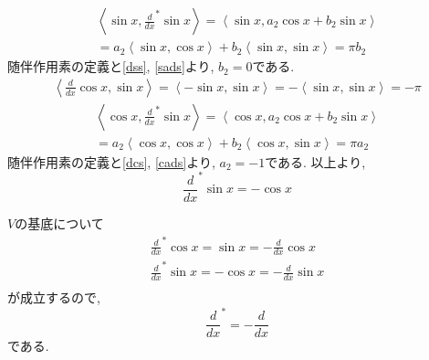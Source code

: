 \documentclass[a4paper,11pt]{jsarticle}
\begin{document}
\begin{enumerate}
    \begin{equation}
      \begin{split}
        \left<\sin{x}, \frac{d}{dx}^*\sin{x}\right>
        = \left<\sin{x}, a_2\cos{x} + b_2\sin{x}\right> \\
        = a_2\left<\sin{x}, \cos{x}\right> + b_2\left<\sin{x}, \sin{x}\right>
        = \pi b_2
      \end{split}
      \label{sads}
    \end{equation}
    随伴作用素の定義と\eqref{dss}, \eqref{sads}より, $b_2=0$である.
    \begin{eqnarray}
      \left<\frac{d}{dx}\cos{x}, \sin{x}\right>
      = \left<-\sin{x}, \sin{x}\right>
      = -\left<\sin{x}, \sin{x}\right>
      = -\pi \label{dcs}
    \end{eqnarray}
    \begin{equation}
      \begin{split}
        \left<\cos{x}, \frac{d}{dx}^*\sin{x}\right>
        = \left<\cos{x}, a_2\cos{x} + b_2\sin{x}\right> \\
        = a_2\left<\cos{x}, \cos{x}\right> + b_2\left<\cos{x}, \sin{x}\right>
        = \pi a_2
      \end{split}
      \label{cads}
    \end{equation}
    随伴作用素の定義と\eqref{dcs}, \eqref{cads}より, $a_2=-1$である.
    以上より, 
    \[
      \frac{d}{dx}^*\sin{x} = -\cos{x}
    \]
\end{enumerate}

$V$の基底について
\begin{eqnarray*}
  \frac{d}{dx}^*\cos{x} = \sin{x} = -\frac{d}{dx}\cos{x} \\
  \frac{d}{dx}^*\sin{x} = -\cos{x} = -\frac{d}{dx}\sin{x} \\
\end{eqnarray*}
が成立するので, 
\[
  \frac{d}{dx}^* = -\frac{d}{dx}
\]
である.
\end{document}
